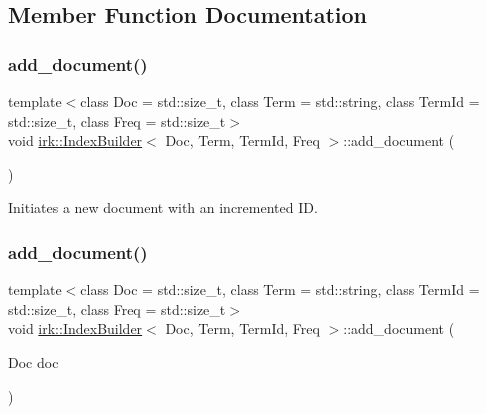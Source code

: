 \subsection{Member Function Documentation}
\mbox{\label{classirk_1_1IndexBuilder_a80a6db5d473f1e23b05533a142749977}} 
\subsubsection{\texorpdfstring{add\+\_\+document()}{add\_document()}\hspace{0.1cm}{\footnotesize\ttfamily [1/2]}}
{\footnotesize\ttfamily template$<$class Doc  = std\+::size\+\_\+t, class Term  = std\+::string, class Term\+Id  = std\+::size\+\_\+t, class Freq  = std\+::size\+\_\+t$>$ \\
void \mbox{\hyperlink{classirk_1_1IndexBuilder}{irk\+::\+Index\+Builder}}$<$ Doc, Term, Term\+Id, Freq $>$\+::add\+\_\+document (\begin{DoxyParamCaption}{ }\end{DoxyParamCaption})\hspace{0.3cm}{\ttfamily [inline]}}



Initiates a new document with an incremented ID. 

\mbox{\label{classirk_1_1IndexBuilder_a2e117cdf6c4fc918aec2120d71d61a89}} 
\subsubsection{\texorpdfstring{add\+\_\+document()}{add\_document()}\hspace{0.1cm}{\footnotesize\ttfamily [2/2]}}
{\footnotesize\ttfamily template$<$class Doc  = std\+::size\+\_\+t, class Term  = std\+::string, class Term\+Id  = std\+::size\+\_\+t, class Freq  = std\+::size\+\_\+t$>$ \\
void \mbox{\hyperlink{classirk_1_1IndexBuilder}{irk\+::\+Index\+Builder}}$<$ Doc, Term, Term\+Id, Freq $>$\+::add\+\_\+document (\begin{DoxyParamCaption}\item[{Doc}]{doc }\end{DoxyParamCaption})\hspace{0.3cm}{\ttfamily [inline]}}



